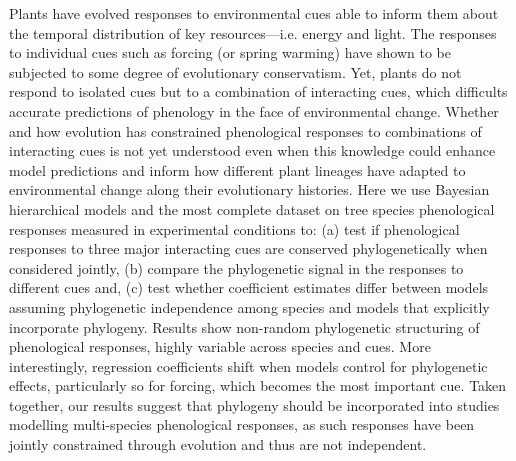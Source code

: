 \documentclass{article}\usepackage[]{graphicx}\usepackage[]{color}
\begin{document}
Plants have evolved responses to environmental cues able to inform them about the temporal distribution of key resources---i.e. energy and light. The responses to individual cues such as forcing (or spring warming) have shown to be subjected to some degree of evolutionary conservatism. Yet, plants do not respond to isolated cues but to a combination of interacting cues, which difficults accurate predictions of phenology in the face of environmental change. Whether and how evolution has constrained phenological responses to combinations of interacting cues is not yet understood even when this knowledge could enhance model predictions and inform how different plant lineages have adapted to environmental change along their evolutionary histories. Here we use Bayesian hierarchical models and the most complete dataset on tree species phenological responses measured in experimental conditions to: (a) test if phenological responses to three major interacting cues are conserved phylogenetically when considered jointly, (b) compare the phylogenetic signal in the responses to different cues and, (c) test whether coefficient estimates differ between models assuming phylogenetic independence among species and models that explicitly incorporate phylogeny. Results show non-random phylogenetic structuring of phenological responses, highly variable across species and cues. More interestingly, regression coefficients shift when models control for phylogenetic effects, particularly so for forcing, which becomes the most important cue. Taken together, our results suggest that phylogeny should be incorporated into studies modelling multi-species phenological responses, as such responses have been jointly constrained through evolution and thus are not independent.  

\clearpage




\end{document}
